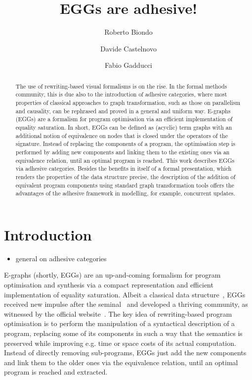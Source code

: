 \documentclass[a4paper,UKenglish,cleveref,pdftex,thm-restate,numberwithinsect]{lipics-v2021}
\title{EGGs are adhesive!}
\author{Roberto Biondo}
{Department of Computer Science, University of Pisa, Pisa, IT}
{r.biondo@studenti.unipi.it}{}{}
\author{Davide Castelnovo}
{Department of Computer Science, University of Pisa, Pisa, IT}
{castelnovod@gmail.com}
{https://orcid.org/0000-0002-5926-5615}{}
\author{Fabio Gadducci}
{Department of Computer Science, University of Pisa, Pisa, IT}
{fabio.gadducci@unipi.it}
{https://orcid.org/0000-0003-0690-3051}{}
\begin{document}
\maketitle

\begin{abstract}
The use of rewriting-based visual formalisms is on the rise. 
%
In the formal methods community, this is due also to the introduction of adhesive
categories, where most properties of classical approaches to graph transformation, 
such as those on parallelism and causality, can be rephrased and proved in a general and 
uniform way.
%
E-graphs (EGGs) are a formalism for program optimisation 
via an efficient implementation of equality saturation. 
In short, EGGs can be  defined as (acyclic) term graphs with an additional notion of 
equivalence on nodes that is closed under the operators of the signature.
Instead of replacing the components of a program, the optimisation step 
is performed by adding new components and linking them to 
the existing ones via an equivalence relation, until an optimal program is reached.
%
This work describes EGGs via adhesive categories. 
Besides the benefits in itself of a formal presentation, which renders the 
properties of the data structure precise, the description of the addition of equivalent 
program components using standard graph transformation tools offers the advantages 
of the adhesive framework in modelling, for example, concurrent updates.
%
\end{abstract}


\section{Introduction}
\begin{itemize}
\item general on adhesive categories
\end{itemize}

E-graphs (shortly, EGGs) are an up-and-coming formalism for program optimisation and synthesis via a compact 
representation and efficient implementation of equality saturation. 
%
Albeit a classical data structure~\cite{DetlefsNS05}, EGGs received 
new impulse after the seminal~\cite{WillseyNWFTP21} and
developed a thriving community, as witnessed by the official website~\cite{eggs}.
%
The key idea of rewriting-based program optimisation is to perform the manipulation of a syntactical description 
of a program, replacing some of its components in such a way that the semantics is preserved while improving 
e.g. time or space costs of its actual computation. Instead of directly removing sub-programs, EGGs just add the 
new components and link them to the older ones via the equivalence relation, until an optimal program is 
reached and extracted.
\end{document}
